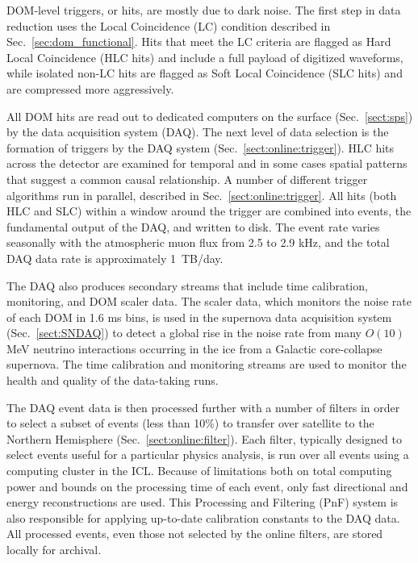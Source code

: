 DOM-level triggers, or hits, are mostly due to dark noise. The first step
in data reduction uses the Local Coincidence (LC) condition described in
Sec.~\ref{sec:dom_functional}.  Hits that meet the LC criteria are flagged
as Hard Local Coincidence (HLC hits) and include a full payload of
digitized waveforms, while isolated non-LC hits are flagged as Soft Local
Coincidence (SLC hits) and are compressed more aggressively.

All DOM hits are read out to dedicated computers on the surface
(Sec.~\ref{sect:sps}) by the data acquisition system (DAQ).  The next level
of data selection is the formation of triggers by the DAQ system
(Sec.~\ref{sect:online:trigger}). HLC hits across the detector are examined
for temporal and in some cases spatial patterns that suggest a common
causal relationship.  A number of different trigger algorithms run in
parallel, described in Sec.~\ref{sect:online:trigger}.  All hits (both HLC
and SLC) within a window around the trigger are combined into events, the
fundamental output of the DAQ, and written to disk.  The event rate varies
seasonally with the atmospheric muon flux from 2.5 to 2.9 kHz,
and the total DAQ data rate is approximately 1~TB/day.

The DAQ also produces secondary streams that include time calibration,
monitoring, and DOM scaler data.  The scaler data, which monitors the
noise rate of each DOM in 1.6 ms bins, is used in the supernova data
acquisition system (Sec.~\ref{sect:SNDAQ}) to detect a global rise in the
noise rate from many $O(10)$ MeV neutrino interactions occurring in the ice
from a Galactic core-collapse supernova.  The time calibration and
monitoring streams are used to monitor the health and quality of the
data-taking runs.

The DAQ event data is then processed further with a number of filters
in order to select a subset of events (less than 10\%) to transfer over
satellite to the Northern Hemisphere (Sec.~\ref{sect:online:filter}).  Each
filter, typically designed to select events useful for a particular physics
analysis, is run over all events using a computing cluster in the ICL.
Because of limitations both on total computing power and bounds on the
processing time of each event, only fast directional and energy
reconstructions are used.  This Processing and Filtering (PnF) system is
also responsible for applying up-to-date calibration constants to the DAQ
data. All processed events, even those not selected by the online filters,
are stored locally for archival.

